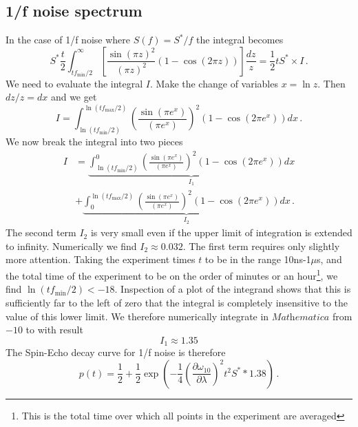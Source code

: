 \documentclass{article}
\begin{document}
\subsection{1/f noise spectrum}

In the case of 1/f noise where $S(f)=S^{*}/f$ the integral becomes
\begin{equation}
S^{*} \frac{t}{2} \int_{t f_{\textrm{min}}/2}^{\infty} \left[ \frac{\sin\left(\pi z\right)^2}{\left(\pi z\right)^2} \left(1 - \cos\left(2\pi z\right)\right) \right] \frac{dz}{z} = \frac{1}{2} t S^{*} \times I \, .
\end{equation}
We need to evaluate the integral $I$.
Make the change of variables $x=\ln z$.
Then $dz/z=dx$ and we get
\begin{equation}
I=\int_{\ln\left(tf_{\textrm{min}}/2\right)}^{\ln\left(tf_{\textrm{max}}/2\right)}\left(\frac{\sin\left(\pi e^{x}\right)}{\left(\pi e^{x}\right)}\right)^{2}\left(1-\cos\left(2\pi e^{x}\right)\right)dx \, .
\end{equation}
We now break the integral into two pieces
\begin{align}
I &=
\underbrace{\int_{\ln\left(tf_{\textrm{min}}/2\right)}^{0}\left(\frac{\sin\left(\pi e^{x}\right)}{\left(\pi e^{x}\right)}\right)^{2}\left(1-\cos\left(2\pi e^{x}\right)\right)dx}_{I_{1}} \nonumber \\
&+ \underbrace{\int_{0}^{\ln\left(tf_{\textrm{max}}/2\right)}\left(\frac{\sin\left(\pi e^{x}\right)}{\left(\pi e^{x}\right)}\right)^{2}\left(1-\cos\left(2\pi e^{x}\right)\right)dx}_{I_{2}} \, .
\end{align}
The second term $I_{2}$ is very small even if the upper limit of integration is extended to infinity.
Numerically we find $I_{2}\approx0.032$.
The first term requires only slightly more attention.
Taking the experiment times $t$ to be in the range 10ns-1$\mu$s, and the total time of the experiment to be on the order of minutes or an hour\footnote{This is the total time over which all points in the experiment are averaged}, we find $\ln(tf_{\textrm{min}}/2)<-18$.
Inspection of a plot of the integrand shows that this is sufficiently far to the left of zero that the integral is completely insensitive to the value of this lower limit.
We therefore numerically integrate in $\textit{Mathematica}$ from $-10$ to with result
\begin{equation}
I_1 \approx 1.35
\end{equation}
The Spin-Echo decay curve for 1/f noise is therefore
\begin{equation}
p(t) = \frac{1}{2} + \frac{1}{2} \exp \left(-\frac{1}{4} \left( \frac{\partial\omega_{10}}{\partial\lambda} \right)^2 t^2 S^{*} * 1.38 \right) \, .
\end{equation}
\end{document}
